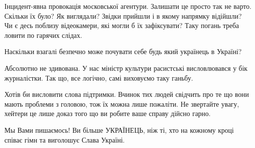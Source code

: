 \begin{itemize}
 

Інцидент-явна провокація московської агентури. Залишати це просто так не варто.
Скільки їх було? Як виглядали? Звідки прийшли і в якому напрямку відійшли? Чи є
десь поблизу відеокамери, які могли б їх зафіксувати? Таку погань треба ловити
по гарячих слідах.


 
Наскільки взагалі безпечно може почувати себе будь який українець в Україні?

 

Абсолютно не здивована. У нас міністр культури расистські висловлювався у бік
журналістки. Так що, все логічно, самі виховуємо таку ганьбу.


 

Хотів би висловити слова підтримки. Вчинок тих людей свідчить про те що вони
мають проблеми з головою, тож їх можна лише пожаліти. Не звертайте увагу,
хейтери це лише доказ того що ви робите ваше справу дійсно гарно.


 
Мы Вами пишаємось! Ви більше УКРАЇНЕЦЬ, ніж ті, хто на кожному кроці співає гімн та виголошує Слава Україні.

 

\end{itemize}
